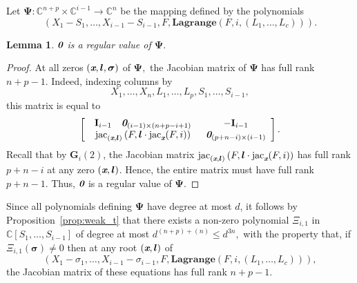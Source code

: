\documentclass[a4paper]{article}
\def\bz{\textit{\textbf{0}}}
\def\lb{{\bm l}}
\def\xb{\textit{\textbf{x}}}
\def\bI{\textbf{I}}
\DeclareMathOperator{\jac}{jac}
\def\C{\mathbb{C}}
\def\lagF{{\bm{Lagrange}}(F,i,(L_1,\hdots,L_c))}
\newtheorem{lemma}[theorem]{Lemma}
\begin{document}
\smallskip

Let $\bm\Psi: \C^{n+p} \times \C^{i-1} \rightarrow \C^{n}$ be the mapping defined by the polynomials
\[
  \left(X_1-S_1,\dots,X_{i-1}-S_{i-1},F,\lagF\right).
\]
%
\begin{lemma}
  $\bz$ is a regular value of $\bm\Psi.$
\end{lemma}
\begin{proof}
At all zeros $(\xb,\lb,\bm \sigma)$ of $\bm\Psi,$ the Jacobian matrix of
$\bm\Psi$ has full rank $n+p-1$. Indeed, indexing columns 
    by 
    \[
    X_1,\dots,X_n,L_1,\hdots,L_p,S_1,\dots,S_{i-1},
    \]
    this matrix is equal to
    \[
    \left[ 
    \begin{array}{cc}
    \begin{array}{cc}
    \bI_{i-1}     & \bz_{(i-1)\times (n+p-i+1)}  
    \end{array}  &-\bI_{i-1}\\
    \jac_{(\xb,\bm l)}\left( F,\lb \cdot \jac_{\xb} (F,i)  \right) & \bz_{(p+n-i)\times (i-1)}
    \end{array}
    \right].
    \]
    Recall that by $\bm G_i(2)$, the Jacobian matrix $\jac_{(\xb,\bm l)}\left( F,\lb \cdot \jac_{\xb} (F,i) \right)$ has full rank $p+n-i$ at any zero $(\xb,\bm l)$. Hence, the entire    
    matrix must have full rank $p+n-1$. Thus,  $\bz$ is a regular value of $\bm\Psi.$
    \end{proof}

Since all polynomials defining $\bm\Psi$ have degree at most $d$, it
follows by Proposition~\ref{prop:weak_t} that there exists a non-zero
polynomial $\Xi_{i,1}$ in $\C[S_1,\dots,S_{i-1}]$ of degree at most
$d^{(n+p)+(n)}\leq d^{3n},$ with the property that, if $\Xi_{i,1}(\bm \sigma)\neq 0$ then at any root $(\xb,\lb)$ of
\[
\left(X_1-\sigma_1,\dots,X_{i-1}-\sigma_{i-1},F,\lagF\right),
\] 
  the Jacobian matrix of these
equations has full rank $n+p-1$. 
\end{document}

